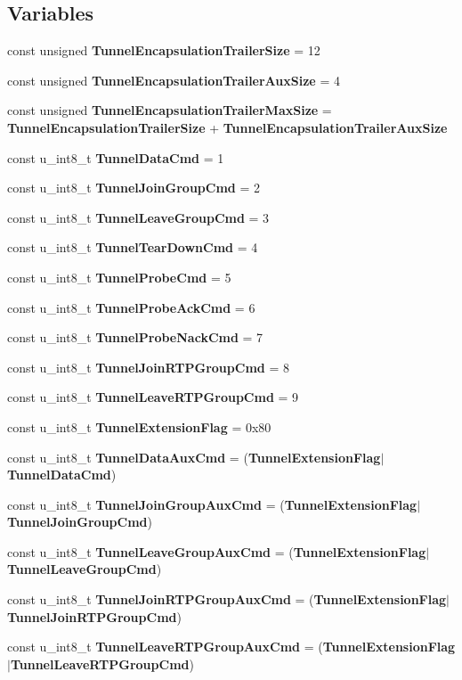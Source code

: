 \subsection*{Variables}
\begin{DoxyCompactItemize}
\item 
const unsigned {\bf Tunnel\+Encapsulation\+Trailer\+Size} = 12
\item 
const unsigned {\bf Tunnel\+Encapsulation\+Trailer\+Aux\+Size} = 4
\item 
const unsigned {\bf Tunnel\+Encapsulation\+Trailer\+Max\+Size} = {\bf Tunnel\+Encapsulation\+Trailer\+Size} + {\bf Tunnel\+Encapsulation\+Trailer\+Aux\+Size}
\item 
const u\+\_\+int8\+\_\+t {\bf Tunnel\+Data\+Cmd} = 1
\item 
const u\+\_\+int8\+\_\+t {\bf Tunnel\+Join\+Group\+Cmd} = 2
\item 
const u\+\_\+int8\+\_\+t {\bf Tunnel\+Leave\+Group\+Cmd} = 3
\item 
const u\+\_\+int8\+\_\+t {\bf Tunnel\+Tear\+Down\+Cmd} = 4
\item 
const u\+\_\+int8\+\_\+t {\bf Tunnel\+Probe\+Cmd} = 5
\item 
const u\+\_\+int8\+\_\+t {\bf Tunnel\+Probe\+Ack\+Cmd} = 6
\item 
const u\+\_\+int8\+\_\+t {\bf Tunnel\+Probe\+Nack\+Cmd} = 7
\item 
const u\+\_\+int8\+\_\+t {\bf Tunnel\+Join\+R\+T\+P\+Group\+Cmd} = 8
\item 
const u\+\_\+int8\+\_\+t {\bf Tunnel\+Leave\+R\+T\+P\+Group\+Cmd} = 9
\item 
const u\+\_\+int8\+\_\+t {\bf Tunnel\+Extension\+Flag} = 0x80
\item 
const u\+\_\+int8\+\_\+t {\bf Tunnel\+Data\+Aux\+Cmd} = ({\bf Tunnel\+Extension\+Flag}$\vert${\bf Tunnel\+Data\+Cmd})
\item 
const u\+\_\+int8\+\_\+t {\bf Tunnel\+Join\+Group\+Aux\+Cmd} = ({\bf Tunnel\+Extension\+Flag}$\vert${\bf Tunnel\+Join\+Group\+Cmd})
\item 
const u\+\_\+int8\+\_\+t {\bf Tunnel\+Leave\+Group\+Aux\+Cmd} = ({\bf Tunnel\+Extension\+Flag}$\vert${\bf Tunnel\+Leave\+Group\+Cmd})
\item 
const u\+\_\+int8\+\_\+t {\bf Tunnel\+Join\+R\+T\+P\+Group\+Aux\+Cmd} = ({\bf Tunnel\+Extension\+Flag}$\vert${\bf Tunnel\+Join\+R\+T\+P\+Group\+Cmd})
\item 
const u\+\_\+int8\+\_\+t {\bf Tunnel\+Leave\+R\+T\+P\+Group\+Aux\+Cmd} = ({\bf Tunnel\+Extension\+Flag}$\vert${\bf Tunnel\+Leave\+R\+T\+P\+Group\+Cmd})
\end{DoxyCompactItemize}


